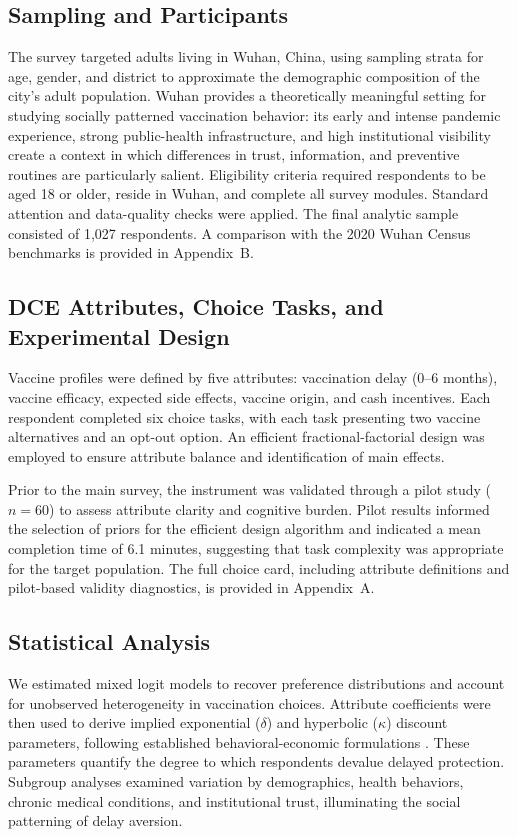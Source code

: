 \documentclass[preprint,12pt]{elsarticle}
\begin{document}
\subsection{Sampling and Participants}

The survey targeted adults living in Wuhan, China, using sampling strata for age, gender, and 
district to approximate the demographic composition of the city’s adult population. Wuhan 
provides a theoretically meaningful setting for studying socially patterned vaccination behavior: 
its early and intense pandemic experience, strong public-health infrastructure, and high 
institutional visibility create a context in which differences in trust, information, and preventive 
routines are particularly salient. Eligibility criteria required respondents to be aged 18 or older, 
reside in Wuhan, and complete all survey modules. Standard attention and data-quality checks were 
applied. The final analytic sample consisted of 1,027 respondents. A comparison with the 2020 
Wuhan Census benchmarks is provided in Appendix~B.

\subsection{DCE Attributes, Choice Tasks, and Experimental Design}

Vaccine profiles were defined by five attributes: vaccination delay (0--6 months), vaccine efficacy, expected side effects, vaccine origin, and cash incentives. Each respondent completed six choice tasks, with each task presenting two vaccine alternatives and an opt-out option. An efficient fractional-factorial design was employed to ensure attribute balance and identification of main effects.

Prior to the main survey, the instrument was validated through a pilot study ($n=60$) to assess attribute clarity and cognitive burden. Pilot results informed the selection of priors for the efficient design algorithm and indicated a mean completion time of 6.1 minutes, suggesting that task complexity was appropriate for the target population. The full choice card, including attribute definitions and pilot-based validity diagnostics, is provided in Appendix~A.

\subsection{Statistical Analysis}

We estimated mixed logit models to recover preference distributions and account for unobserved heterogeneity in vaccination choices. Attribute coefficients were then used to derive implied exponential ($\delta$) and hyperbolic ($\kappa$) discount parameters, following established behavioral-economic formulations \cite{vanderPol2001}. These parameters quantify the degree to which respondents devalue delayed protection. Subgroup analyses examined variation by demographics, health behaviors, chronic medical conditions, and institutional trust, illuminating the social patterning of delay aversion.
\end{document}

